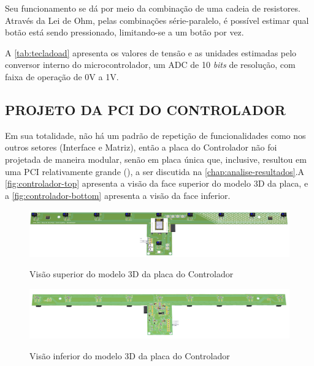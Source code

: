 Seu funcionamento se dá por meio da combinação de uma cadeia de resistores. Através da Lei de Ohm, pelas combinações série-paralelo, é possível estimar qual botão está sendo pressionado, limitando-se a um botão por vez.

A \autoref{tab:tecladoad} apresenta os valores de tensão e as unidades estimadas pelo conversor interno do microcontrolador, um ADC de 10 \emph{bits} de resolução, com faixa de operação de 0V a 1V.



\subsection{PROJETO DA PCI DO CONTROLADOR}
\label{subsec:pcicontrol}

Em sua totalidade, não há um padrão de repetição de funcionalidades como nos outros setores (Interface e Matriz), então a placa do Controlador não foi projetada de maneira modular, senão em placa única que, inclusive, resultou em uma PCI relativamente grande (), a ser discutida na \autoref{chap:analise-resultados}.A \autoref{fig:controlador-top} apresenta a visão da face superior do modelo 3D da placa, e a \autoref{fig:controlador-bottom} apresenta a visão da face inferior.

\begin{figure}[H]
    \centering
    \caption{Visão superior do modelo 3D da placa do Controlador}
    \includegraphics[width=1.0\textwidth]{./dados/figuras/controlador-top}
    \label{fig:controlador-top}
\end{figure}

\begin{figure}[H]
    \centering
    \caption{Visão inferior do modelo 3D da placa do Controlador}
    \includegraphics[width=1.0\textwidth]{./dados/figuras/controlador-bottom}
    \label{fig:controlador-bottom}
\end{figure}

